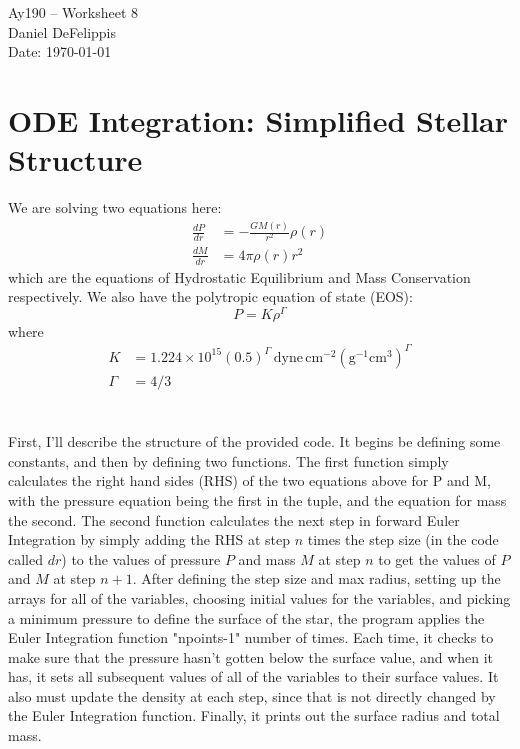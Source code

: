 \documentclass[11pt,letterpaper]{article}
\newcommand{\unit}[1]{\ensuremath{\, \mathrm{#1}}}
\begin{document}
\begin{center}
\Large
Ay190 -- Worksheet 8\\
Daniel DeFelippis\\
Date: \today
\end{center}


\section*{ODE Integration: Simplified Stellar Structure}

We are solving two equations here:
\begin{align*}
\frac{dP}{dr} &= -\frac{GM(r)}{r^2}\rho(r) \\
\frac{dM}{dr} &= 4\pi \rho(r) r^2
\end{align*}
which are the equations of Hydrostatic Equilibrium and Mass
Conservation respectively. We also have the polytropic equation of state (EOS):
$$ P = K\rho^{\Gamma} $$
where 
\begin{align*}
K &= 1.224 \times 10^{15}(0.5)^{\Gamma} \unit{dyne \hspace{2pt} cm^{-2} (g^{-1}cm^{3})}^{\Gamma} \\
\Gamma &= 4/3
\end{align*}


\section{}

First, I'll describe the structure of the provided code. It begins be defining some 
constants, and then by defining two functions. The first function simply calculates
the right hand sides (RHS) of the two equations above for P and M, with the pressure
equation being the first in the tuple, and the equation for mass the second. The second 
function calculates the next step in forward Euler Integration by simply adding 
the RHS at step $n$ times the step size (in the code called $dr$) to the values of
pressure $P$ and mass $M$ at step $n$ to get the values of $P$ and $M$ at step $n+1$. 
After defining the step size and max radius, setting up the arrays for 
all of the variables, choosing initial values for the variables, and picking a 
minimum pressure to define the surface of the star, the program applies the 
Euler Integration function "npoints-1" number of times. Each time, it checks to make
sure that the pressure hasn't gotten below the surface value, and when it has, 
it sets all subsequent values of all of the variables to their surface values. It also
must update the density at each step, since that is not directly changed by the 
Euler Integration function. Finally, it prints out the surface radius and total mass.
\end{document}
